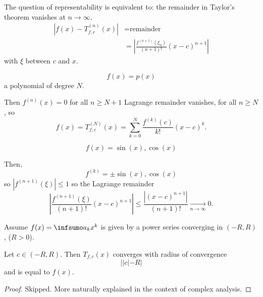 \documentclass[10pt, a4paper]{article}
\begin{document}
The question of representability is equivalent to:
the remainder in Taylor's theorem vanishes at $n \to \infty$.
\begin{align*}
    |f(x) - T_{f, c}^{(n)}(x)| &= \text{remainder} \\
    &= \left|\frac{f ^ {(n + 1)}(\xi_n)}{(n + 1)!}(x - c) ^ {n + 1}\right|
\end{align*}
with $\xi$ between $c$ and $x$.

\begin{example}
    \[
    f(x) = p(x)
    \]
    a polynomial of degree $N$.

    \begin{solution}
        Then $f ^ {(n)}(x) = 0$ for all $n \geq N + 1$ Lagrange remainder vanishes,
        for all $n \geq N$,
        so
        \[
        f(x) = T_{f, c}^{(N)}(x) = \sum_{k = 0}^{N}\frac{f ^ {(k)}(c)}{k!}(x - c) ^ k.
        \]
    \end{solution}
\end{example}

\begin{example}
    \[
    f(x) = \sin(x), \cos(x)
    \]

    \begin{solution}
        Then,
        \[
        f ^ {(k)} = \pm\sin(x), \cos(x)
        \]
        so $|f ^ {(n + 1)}(\xi)| \leq 1$ so the Lagrange remainder
        \[
        \left|\frac{f ^ {(n + 1)}(\xi)}{(n + 1)!}(x - c) ^ {n + 1}\right| \leq \frac{\left|(x - c) ^ {n + 1}\right|}{(n + 1)!} \xrightarrow[n \to \infty]{} 0.
        \]
    \end{solution}
\end{example}

\begin{proposition}
    Assume $f(x) = \infsumo a_kx ^ k$ is given by a power series converging in $(-R, R)$,
    ($R > 0$).

    Let $c \in (-R, R)$.
    Then $T_{f, c}(x)$ converges with radius of convergence
    \[
    ||c| - R|
    \]
    and is equal to $f(x)$.

    \begin{proof}
        Skipped.
        More naturally explained in the context of complex analysis.
    \end{proof}
\end{proposition}
\end{document}
